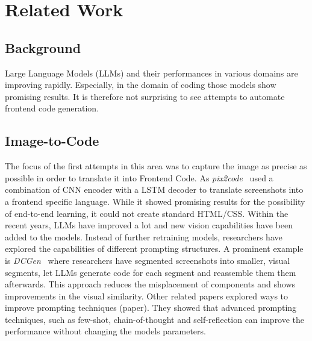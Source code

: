 \chapter{Related Work}\label{chapter:RelatedWork}

\section{Background}
Large Language Models (LLMs) and their performances in various domains are improving 
rapidly. Especially, in the domain of coding those models show promising results. 
It is therefore not surprising to see attempts to automate frontend code generation.

\section{Image-to-Code}
The focus of the first attempts in this area was to capture the image as precise as 
possible in order to translate it into Frontend Code. As \textit{pix2code}~\parencite{beltramelli2017pix2code} 
used a combination of CNN encoder with a LSTM decoder to translate screenshots into 
a frontend specific language. While it showed promising results for the possibility 
of end-to-end learning, it could not create standard HTML/CSS.\newline
Within the recent years, LLMs have improved a lot and new vision capabilities have been 
added to the models. Instead of further retraining models, researchers have 
explored the capabilities of different prompting structures. A prominent example is
\textit{DCGen}~\parencite{wan2024dcgen} where researchers have segmented screenshots 
into smaller, visual segments, let LLMs generate code for each segment and reassemble 
them them afterwards. This approach reduces the misplacement of components and shows
improvements in the visual similarity.\newline
Other related papers explored ways to improve prompting techniques (paper). They 
showed that advanced prompting techniques, such as few-shot, chain-of-thought and 
self-reflection can improve the performance without changing the models parameters.


